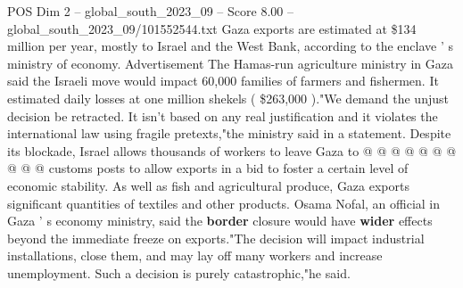 \begin{textsample}{POS Dim 2 – global\_south\_2023\_09 – Score 8.00 – global\_south\_2023\_09/101552544.txt}
Gaza exports are estimated at \$134 million per year, mostly to Israel and the West Bank, according to the enclave ' s ministry of economy.
Advertisement The Hamas-run agriculture ministry in Gaza said the Israeli move would impact 60,000 families of farmers and fishermen.
It estimated daily losses at one million shekels ( \$263,000 )."We demand the unjust decision be retracted.
It isn't based on any real justification and it violates the international law using fragile pretexts,"the ministry said in a statement.
Despite its blockade, Israel allows thousands of workers to leave Gaza to @ @ @ @ @ @ @ @ @ @ customs posts to allow exports in a bid to foster a certain level of economic stability.
As well as fish and agricultural produce, Gaza exports significant quantities of textiles and other products.
Osama Nofal, an official in Gaza ' s economy ministry, said the \textbf{border} closure would have \textbf{wider} effects beyond the immediate freeze on exports."The decision will impact industrial installations, close them, and may lay off many workers and increase unemployment.
Such a decision is purely catastrophic,"he said.

\end{textsample}
